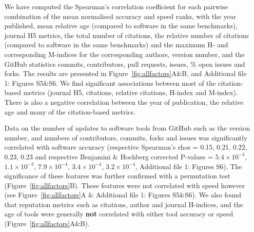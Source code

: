 \documentclass{bmcart}
\begin{document}
We have computed the Spearman’s correlation coefficient for each
pairwise combination of the mean normalised accuracy and speed ranks,
with the year published, mean relative age (compared to software in the
same benchmarks), journal H5 metrics, the total number of citations,
the relative number of citations (compared to software in the same
benchmarks) and the maximum H- and corresponding M-indices for the corresponding
authors, version number,
{\color{red}and the GitHub statistics commits, contributors, pull requests, issues, \% open issues and forks}.
The results are presented in Figure~\ref{fig:allfactors}A\&B, and Additional file 1: Figures S5\&S6. We find
significant associations between most of the citation-based metrics
(journal H5, citations, relative citations, H-index and
M-index). There is also a negative correlation between the year of
publication, the relative age and many of the citation-based metrics.

Data on the number of updates to software tools from GitHub such as
the version number, {\color{red}and numbers of contributors, commits, forks and issues } was significantly
correlated with software accuracy (respective Spearman’s rhos =
{\color{red}0.15, 0.21, 0.22, 0.23, 0.23 and respective Benjamini \& Hochberg
  corrected P-values = $5.4\times 10^{-4}$, $1.1\times 10^{-3}$, $7.9\times 10^{-4}$, $3.4\times 10^{-4}$, $3.2\times 10^{-4}$, Additional file 1: Figures S6}). %
The significance of these features was
further confirmed with a permutation test
(Figure~\ref{fig:allfactors}B).  These features were not correlated
with speed however (see Figure~\ref{fig:allfactors}A {\color{red}\& Additional file 1: Figures S5\&S6}).
We also found that
reputation metrics such as citations, author and journal H-indices,
and the age of tools were generally \textbf{not} correlated with
either tool accuracy or speed (Figure~\ref{fig:allfactors}A\&B).


\end{document}
